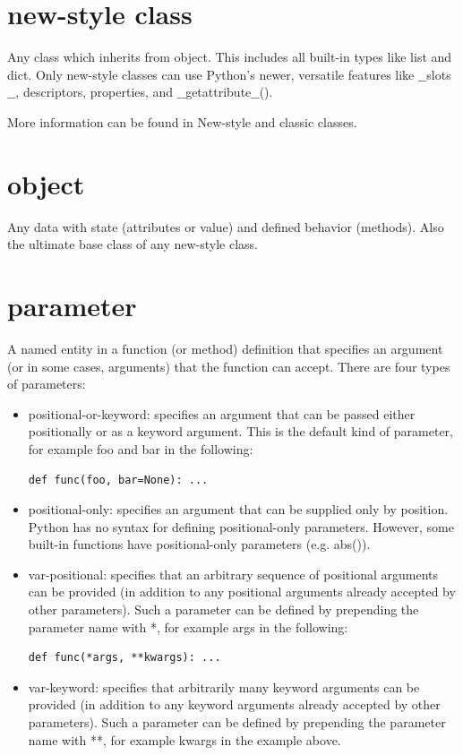 \documentclass[12pt,a4paper,final,twoside,onecolumn,titlepage]{book}
\begin{document}
\section{new-style class}
Any class which inherits from object. This includes all built-in types like list and dict. Only new-style classes can use Python’s newer, versatile features like $\_\_$slots$\_\_$, descriptors, properties, and $\_\_$getattribute$\_\_$().

More information can be found in New-style and classic classes.

\section{object}
Any data with state (attributes or value) and defined behavior (methods). Also the ultimate base class of any new-style class.

\section{parameter}
A named entity in a function (or method) definition that specifies an argument (or in some cases, arguments) that the function can accept. There are four types of parameters:
\begin{itemize}
\item positional-or-keyword: specifies an argument that can be passed either positionally or as a keyword argument. This is the default kind of parameter, for example foo and bar in the following:
\begin{lstlisting}
def func(foo, bar=None): ...
\end{lstlisting}
\item positional-only: specifies an argument that can be supplied only by position. Python has no syntax for defining positional-only parameters. However, some built-in functions have positional-only parameters (e.g. abs()).

\item var-positional: specifies that an arbitrary sequence of positional arguments can be provided (in addition to any positional arguments already accepted by other parameters). Such a parameter can be defined by prepending the parameter name with *, for example args in the following:
\begin{lstlisting}
def func(*args, **kwargs): ...
\end{lstlisting}
\item var-keyword: specifies that arbitrarily many keyword arguments can be provided (in addition to any keyword arguments already accepted by other parameters). Such a parameter can be defined by prepending the parameter name with **, for example kwargs in the example above.
\end{itemize}
\end{document}
